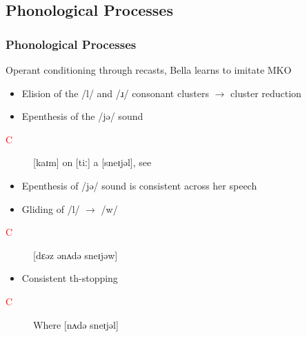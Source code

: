 \documentclass[compress]{beamer}
\begin{document}
\subsection{Phonological Processes}
\begin{frame}
	\frametitle{Phonological Processes}
	
	Operant conditioning through recasts, Bella learns to imitate MKO
	
	\begin{itemize}
		\item Elision of the /l/ and /ɹ/ consonant clusters $\rightarrow$ cluster reduction
		\item Epenthesis of the /jə/ sound
	\end{itemize}
	\begin{description}
		\item[\textcolor{red}{C}] [kaɪm] on [tiː] a [sneɪjəl], see
	\end{description}
	
	\begin{itemize}
		\item Epenthesis of /jə/ sound is consistent across her speech
		\item Gliding of /l/ $\rightarrow$ /w/
	\end{itemize}
	\begin{description}
		\item[\textcolor{red}{C}] [dɛəz ənʌdə sneɪjəw]
	\end{description}
	
	\begin{itemize}
		\item Consistent th-stopping
	\end{itemize}
	\begin{description}
		\item[\textcolor{red}{C}] Where [nʌdə sneɪjəl]
	\end{description}
	
\end{frame}
\end{document}
